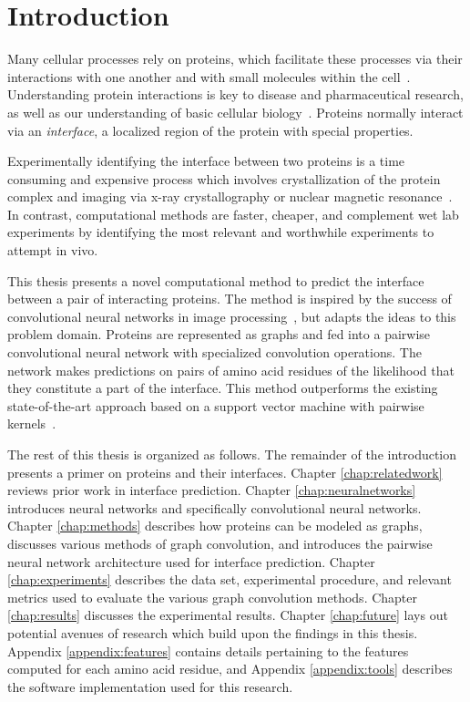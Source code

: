 \chapter{Introduction}
\label{chap:intro}

Many cellular processes rely on proteins, which facilitate these processes via their interactions with one another and with small molecules within the cell~\cite{scheeffink2003}.
Understanding protein interactions is key to disease and pharmaceutical research, as well as our understanding of basic cellular biology~\cite{fauman2003, altman2003}.
Proteins normally interact via an \emph{interface}, a localized region of the protein with special properties.

Experimentally identifying the interface between two proteins is a time consuming and expensive process which involves crystallization of the protein complex and imaging via x-ray crystallography or nuclear magnetic resonance~\cite{bijelic2017, ilarisavino2017, wang2017}.
In contrast, computational methods are faster, cheaper, and complement wet lab experiments by identifying the most relevant and worthwhile experiments to attempt in vivo.

This thesis presents a novel computational method to predict the interface between a pair of interacting proteins.
The method is inspired by the success of convolutional neural networks in image processing~\cite{gu2015, lecun2010}, but adapts the ideas to this problem domain.
Proteins are represented as graphs and fed into a pairwise convolutional neural network with specialized convolution operations.
The network makes predictions on pairs of amino acid residues of the likelihood that they constitute a part of the interface. 
This method outperforms the existing state-of-the-art approach based on a support vector machine with pairwise kernels~\cite{minhas2014}.

The rest of this thesis is organized as follows.
The remainder of the introduction presents a primer on proteins and their interfaces. 
Chapter \ref{chap:relatedwork} reviews prior work in interface prediction.
Chapter \ref{chap:neuralnetworks} introduces neural networks and specifically convolutional neural networks.
Chapter \ref{chap:methods} describes how proteins can be modeled as graphs, discusses various methods of graph convolution, and introduces the pairwise neural network architecture used for interface prediction.
Chapter \ref{chap:experiments} describes the data set, experimental procedure, and relevant metrics used to evaluate the various graph convolution methods. 
Chapter \ref{chap:results} discusses the experimental results.
Chapter \ref{chap:future} lays out potential avenues of research which build upon the findings in this thesis. 
Appendix \ref{appendix:features} contains details pertaining to the features computed for each amino acid residue, and Appendix \ref{appendix:tools} describes the software implementation used for this research.


